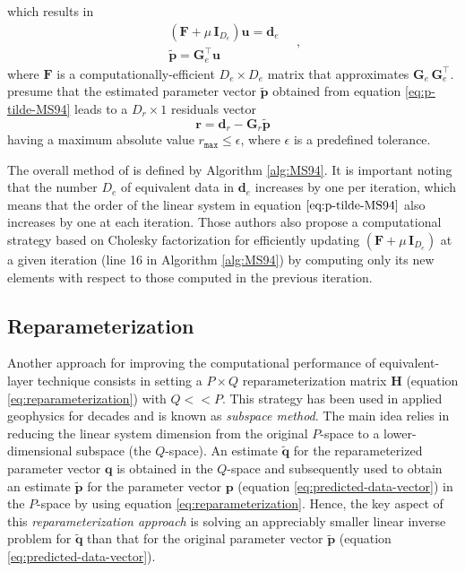 which results in
\begin{equation}
	\begin{split}
		\left(\mathbf{F} + \mu \, \mathbf{I}_{D_{e}} \right) \mathbf{u} = \mathbf{d}_{e} \\
		\tilde{\mathbf{p}} = \mathbf{G}_{e}^{\top} \mathbf{u}
	\end{split} \quad ,
	\label{eq:p-tilde-MS94}
\end{equation}
where $\mathbf{F}$ is a computationally-efficient $D_{e} \times D_{e}$ matrix that approximates $\mathbf{G}_{e} \, \mathbf{G}_{e}^{\top}$.
\cite{mendonca-silva1994} presume that the estimated parameter vector $\tilde{\mathbf{p}}$ obtained from equation \ref{eq:p-tilde-MS94}
leads to a $D_{r} \times 1$ residuals vector
\begin{equation}
	\mathbf{r} = \mathbf{d}_{r} - \mathbf{G}_{r} \tilde{\mathbf{p}} 
	\label{eq:residuals-MS94}
\end{equation}
having a maximum absolute value $r_{\mathtt{max}} \le \epsilon$, where $\epsilon$ is a predefined tolerance.

The overall method of \cite{mendonca-silva1994} is defined by Algorithm \ref{alg:MS94}.
It is important noting that the number $D_{e}$ of equivalent data in $\mathbf{d}_{e}$ increases by one per iteration,
which means that the order of the linear system in equation $\ref{eq:p-tilde-MS94}$ also increases by one at each iteration.
Those authors also propose a computational strategy based on Cholesky factorization \cite[e.g.,][p. 163]{golub-vanloan2013}
for efficiently updating 
$\left(\mathbf{F} + \mu \, \mathbf{I}_{D_{e}} \right)$ at a given iteration (line 16 in Algorithm \ref{alg:MS94}) 
by computing only its new elements with respect to those computed in the previous iteration.

\subsection{Reparameterization}

Another approach for improving the computational performance of equivalent-layer technique consists in 
setting a $P \times Q$ reparameterization matrix $\mathbf{H}$ (equation \ref{eq:reparameterization})
with $Q << P$. 
This strategy has been used in applied geophysics for decades \cite[e.g.,][]{skilling-bryan1984, kennett1988, oldenburg1993, barbosa-etal1997} 
and is known as \textit{subspace method}. 
The main idea relies in reducing the linear system dimension from the original $P$-space to a lower-dimensional subspace (the $Q$-space).
An estimate $\tilde{\mathbf{q}}$ for the reparameterized parameter vector $\mathbf{q}$
is obtained in the $Q$-space and subsequently used to obtain an estimate $\tilde{\mathbf{p}}$ 
for the parameter vector $\mathbf{p}$ (equation \ref{eq:predicted-data-vector}) in the $P$-space by using equation
\ref{eq:reparameterization}. 
Hence, the key aspect of this \textit{reparameterization approach} is solving an appreciably smaller linear inverse problem for 
$\tilde{\mathbf{q}}$ than that for the original parameter vector $\tilde{\mathbf{p}}$ (equation \ref{eq:predicted-data-vector}).

